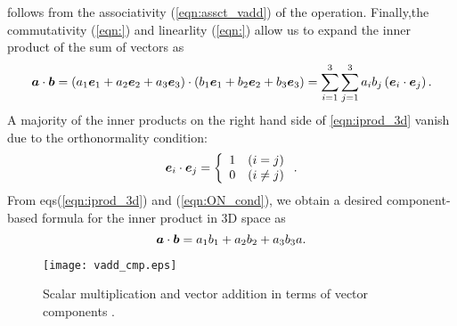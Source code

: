 \documentclass[10pt,a4j]{article}
\begin{document}
follows from the associativity (\ref{eqn:assct_vadd}) of the operation. 
Finally,the commutativity (\ref{eqn:}) and linearlity (\ref{eqn:}) allow us to expand 
the inner product of the sum of vectors as 
\begin{equation}
	\mbox{\boldmath $a$}\cdot\mbox{\boldmath $b$}=
	\left(a_1\mbox{\boldmath $e$}_1+ a_2\mbox{\boldmath $e$}_2+ a_3\mbox{\boldmath $e$}_3 \right)
	\cdot
	\left(b_1\mbox{\boldmath $e$}_1+ b_2\mbox{\boldmath $e$}_2+ b_3\mbox{\boldmath $e$}_3 \right) 
	=
	\sum_{i=1}^3\sum_{j=1}^3
	a_ib_j\left(\mbox{\boldmath $e$}_i\cdot\mbox{\boldmath $e$}_j\right).
	\label{eqn:iprod_3d}
\end{equation}
A majority of the inner products on the right hand side of \ref{eqn:iprod_3d}
vanish due to the orthonormality condition: 
\begin{equation}
	\mbox{\boldmath $e$}_i\cdot\mbox{\boldmath $e$}_j=
	\left\{
		\begin{array}{cc}
			1 & (i=j) \\
			0 & (i\neq j)
		\end{array}
	\right.
	\label{eqn:ON_cond}.
\end{equation}
From eqs(\ref{eqn:iprod_3d}) and (\ref{eqn:ON_cond}), we obtain a desired component-based formula for the inner product 
in 3D space as 
\begin{equation}
	\mbox{\boldmath $a$}\cdot\mbox{\boldmath $b$}= a_1b_1+a_2b_2+a_3b_3a.
	\label{eqn:}
\end{equation}
\begin{figure}[h]
	\begin{center}
	\texttt{[image: vadd\_cmp.eps]} 
	\end{center}
	\caption{Scalar multiplication and vector addition in terms of vector components .} 
	\label{fig:fig1_8}
\end{figure}
\end{document}
